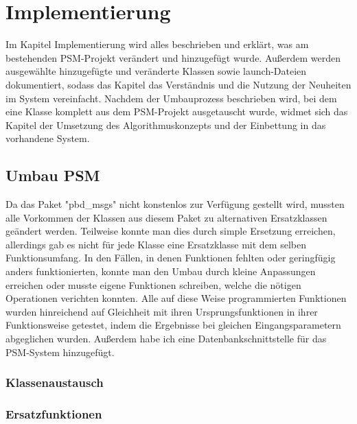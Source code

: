 \chapter{Implementierung}\label{ch:implementierung}

Im Kapitel Implementierung wird alles beschrieben und erklärt, was am bestehenden PSM-Projekt verändert und hinzugefügt wurde. Außerdem werden ausgewählte hinzugefügte und veränderte Klassen sowie launch-Dateien dokumentiert, sodass das Kapitel das Verständnis und die Nutzung der Neuheiten im System vereinfacht. Nachdem der Umbauprozess beschrieben wird, bei dem eine Klasse komplett aus dem PSM-Projekt ausgetauscht wurde, widmet sich das Kapitel der Umsetzung des Algorithmuskonzepts und der Einbettung in das vorhandene System.

\section{Umbau PSM}
Da das Paket "pbd\_msgs" nicht konstenlos zur Verfügung gestellt wird, mussten alle Vorkommen der Klassen aus diesem Paket zu alternativen Ersatzklassen geändert werden. Teilweise konnte man dies durch simple Ersetzung erreichen, allerdings gab es nicht für jede Klasse eine Ersatzklasse mit dem selben Funktionsumfang. In den Fällen, in denen Funktionen fehlten oder geringfügig anders funktionierten, konnte man den Umbau durch kleine Anpassungen erreichen oder musste eigene Funktionen schreiben, welche die nötigen Operationen verichten konnten. Alle auf diese Weise programmierten Funktionen wurden hinreichend auf Gleichheit mit ihren Ursprungsfunktionen in ihrer Funktionsweise getestet, indem die Ergebnisse bei gleichen Eingangsparametern abgeglichen wurden. Außerdem habe ich eine Datenbankschnittstelle für das PSM-System hinzugefügt.
\subsection{Klassenaustausch}

\subsection{Ersatzfunktionen}

